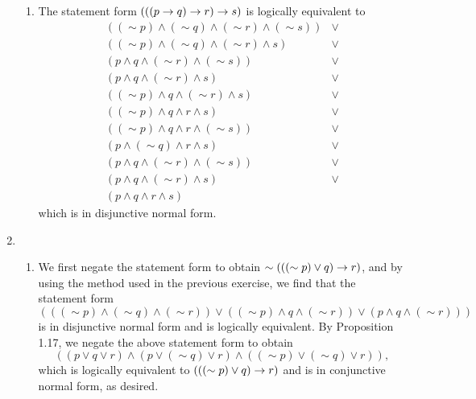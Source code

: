 \begin{enumerate}
\begin{enumerate}[label = (\alph*), align = left]
      \item The statement form \((((p \rightarrow q) \rightarrow r) \rightarrow s)\) is logically equivalent to
        \[
          \begin{array}{cc}
            ((\sim p) \land (\sim q) \land (\sim r) \land (\sim s))&
            \lor\\
            ((\sim p) \land (\sim q) \land (\sim r) \land s)&
            \lor\\
            (p \land q \land (\sim r) \land (\sim s))&
            \lor\\
            (p \land q \land (\sim r) \land s)&
            \lor\\
            ((\sim p) \land q \land (\sim r) \land s)&
            \lor\\
            ((\sim p) \land q \land r \land s)&
            \lor\\
            ((\sim p) \land q \land r \land (\sim s))&
            \lor\\
            (p \land (\sim q) \land r \land s)&
            \lor\\
            (p \land q \land (\sim r) \land (\sim s))&
            \lor\\
            (p \land q \land (\sim r) \land s)&
            \lor\\
            (p \land q \land r \land s)&
          \end{array}
        \]
        which is in disjunctive normal form.

    \end{enumerate}

  \item %
    \begin{enumerate}[label = (\alph*), align = left]
      \item We first negate the statement form to obtain \(\sim(((\sim p) \lor q) \rightarrow r)\), and by using the method used in the previous exercise, we find that the statement form
        \[(((\sim p) \land (\sim q) \land (\sim r)) \lor ((\sim p) \land q \land (\sim r)) \lor (p \land q \land (\sim r)))\]
        is in disjunctive normal form and is logically equivalent. By Proposition 1.17, we negate the above statement form to obtain
        \[((p \lor q \lor r) \land (p \lor (\sim q) \lor r) \land ((\sim p) \lor (\sim q) \lor r)),\]
        which is logically equivalent to \((((\sim p) \lor q) \rightarrow r)\) and is in conjunctive normal form, as desired.


\end{enumerate}
\end{enumerate}
